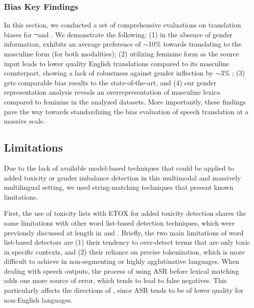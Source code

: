 \subsubsection{Bias Key Findings}

In this section, we conducted a set of comprehensive evaluations on translation biases for \st\ and \sst. We demonstrate the following: (1) in the absence of gender information, \mfourtlg exhibits an average preference of $\sim$10\% towards translating to the masculine form (for both modalities); (2) utilizing feminine form as the source input leads to lower quality English translations compared to its masculine counterpart, showing a lack of robustness against gender inflection by $\sim$3\% ; (3) \mfourtlg gets comparable bias results to the state-of-the-art, %
 and (4) our gender representation analysis reveals an overrepresentation of masculine lexica compared to feminine in the analyzed datasets.
More importantly, these findings pave the way towards standardizing the bias evaluation of speech translation at a massive scale.



\subsection{Limitations}\label{sec:appendix:rai:rai_limitations}
Due to the lack of available model-based techniques that could be applied to added toxicity or gender imbalance detection in this multimodal and massively multilingual setting, we used string-matching techniques that present known limitations.

First, the use of toxicity lists with ETOX for added toxicity detection shares the same limitations with other word list-based detection techniques, which were previously discussed at length in \cite{nllb2022} and \cite{costajussa2023toxicity}. Briefly, the two main limitations of word list-based detectors are (1) their tendency to over-detect terms that are only toxic in specific contexts, and (2) their reliance on precise tokenization, which is more difficult to achieve in non-segmenting or highly agglutinative languages. When dealing with speech outputs, the process of using ASR before lexical matching adds one more source of error, which tends to lead to false negatives. This particularly affects the directions of \engx, since ASR tends to be of lower quality for non-English languages.

